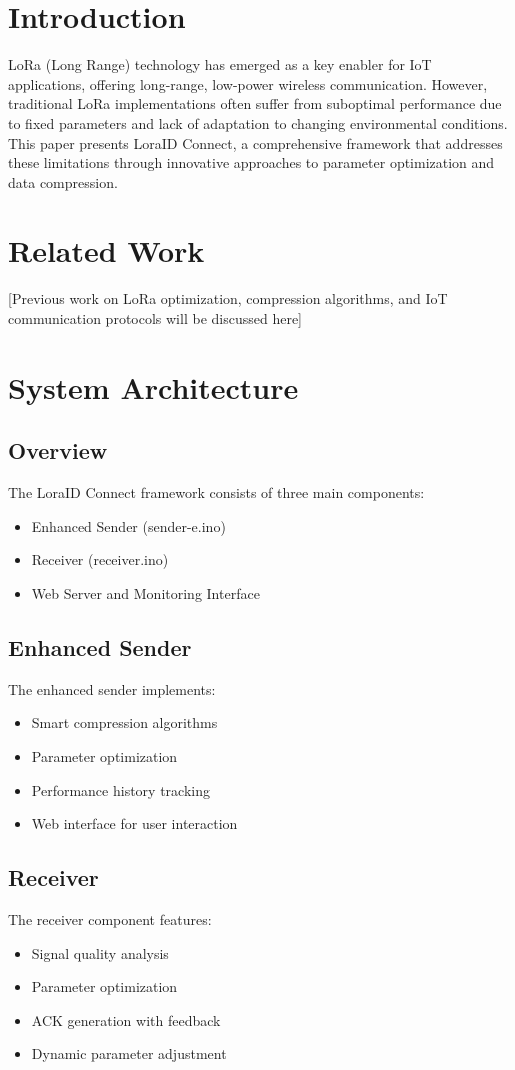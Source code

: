 \documentclass[conference]{IEEEtran}
\begin{document}
\section{Introduction}
LoRa (Long Range) technology has emerged as a key enabler for IoT applications, offering long-range, low-power wireless communication. However, traditional LoRa implementations often suffer from suboptimal performance due to fixed parameters and lack of adaptation to changing environmental conditions. This paper presents LoraID Connect, a comprehensive framework that addresses these limitations through innovative approaches to parameter optimization and data compression.

\section{Related Work}
[Previous work on LoRa optimization, compression algorithms, and IoT communication protocols will be discussed here]

\section{System Architecture}
\subsection{Overview}
The LoraID Connect framework consists of three main components:
\begin{itemize}
    \item Enhanced Sender (sender-e.ino)
    \item Receiver (receiver.ino)
    \item Web Server and Monitoring Interface
\end{itemize}

\subsection{Enhanced Sender}
The enhanced sender implements:
\begin{itemize}
    \item Smart compression algorithms
    \item Parameter optimization
    \item Performance history tracking
    \item Web interface for user interaction
\end{itemize}

\subsection{Receiver}
The receiver component features:
\begin{itemize}
    \item Signal quality analysis
    \item Parameter optimization
    \item ACK generation with feedback
    \item Dynamic parameter adjustment
\end{itemize}
\end{document}

